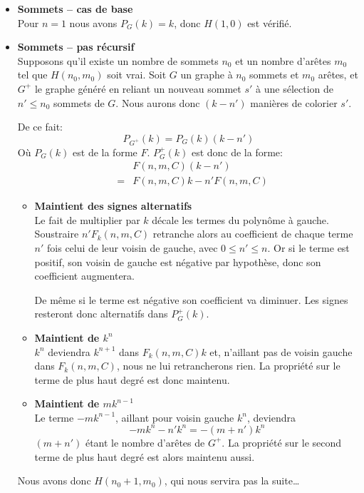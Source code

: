 \begin{itemize}
\item \textbf{Sommets -- cas de base} \\
Pour $n = 1$ nous avons $P_G(k) = k$, donc $H(1,0)$ est vérifié.
\item \textbf{Sommets -- pas récursif} \\ Supposons qu'il existe un nombre de sommets $n_0$ et un nombre d'arêtes $m_0$ tel que $H(n_0,m_0)$ soit vrai. Soit $G$ un graphe à $n_0$ sommets et $m_0$ arêtes, et $G^+$ le graphe généré en reliant un nouveau sommet $s'$ à une sélection de $n' \leq n_0$ sommets de $G$. Nous aurons donc $(k-n')$ manières de colorier $s'$.

De ce fait:
\[ P_{G^+}(k) = P_G(k)(k-n') \]
Où $P_G(k)$ est de la forme $F$. $P_G^+(k)$ est donc de la forme:
\begin{eqnarray*}
&&	F(n,m,C)(k-n')			\\
&=& F(n,m,C)k - n'F(n,m,C)	
\end{eqnarray*} 
\begin{itemize}
\item \textbf{Maintient des signes alternatifs} \\ 
Le fait de multiplier par $k$ \og décale \fg les termes du polynôme à gauche. Soustraire $n'F_k(n,m,C)$ retranche alors au coefficient de chaque terme $n'$ fois celui de leur voisin de gauche, avec $0 \leq n' \leq n$. Or si le terme est positif, son voisin de gauche est négative par hypothèse, donc son coefficient augmentera.

De même si le terme est négative son coefficient va diminuer. Les signes resteront donc alternatifs dans $P_G^+(k)$.

\item \textbf{Maintient de $k^n$} \\
$k^{n}$ deviendra $k^{n+1}$ dans $F_k(n,m,C)k$ et, n'aillant pas de voisin gauche dans $F_k(n,m,C)$, nous ne lui retrancherons rien. La propriété sur le terme de plus haut degré est donc maintenu.

\item \textbf{Maintient de $mk^{n-1}$} \\
Le terme $-mk^{n-1}$, aillant pour voisin gauche $k^n$, deviendra
\[-mk^n - n'k^n = -(m+n')k^n \]
$(m+n')$ étant le nombre d'arêtes de $G^+$. La propriété sur le second terme de plus haut degré est alors maintenu aussi.
\end{itemize}
Nous avons donc $H(n_0+1, m_0)$, qui nous servira pas la suite\ldots


\end{itemize}
